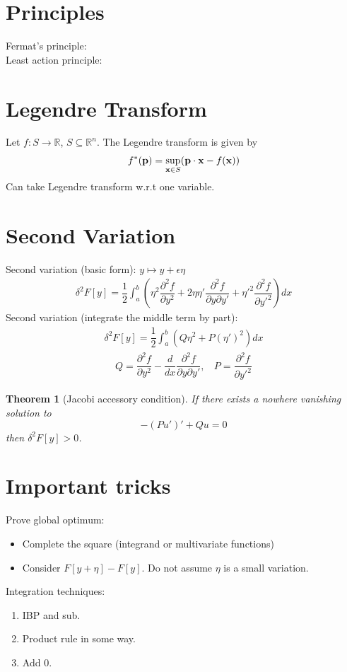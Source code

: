 \documentclass{article}
\theoremstyle{definition}
\theoremstyle{remark}
\theoremstyle{plain}
\newtheorem{thm}[defn]{Theorem}
\newcommand{\RR}{\mathbb{R}}
\begin{document}
\section{Principles}
Fermat's principle:\\
Least action principle:

\section{Legendre Transform}
Let $f:S\to \RR$, $S\subseteq\RR^n$. The Legendre transform is given by
\begin{align*}
    f^\ast({\bf p})=\sup_{{\bf x}\in S}({\bf p}\cdot {\bf x}-f({\bf x}))
\end{align*}
Can take Legendre transform w.r.t one variable.

\section{Second Variation}
Second variation (basic form): $y\mapsto y+\epsilon\eta$
\begin{align*}
    \delta^2F[y]=\dfrac{1}{2}\int_a^b\left(\eta^2\dfrac{\partial^2 f}{\partial y^2}+2\eta\eta'\dfrac{\partial^2 f}{\partial y\partial y'}+\eta'^2\dfrac{\partial^2 f}{\partial y'^2}\right)dx
\end{align*}
Second variation (integrate the middle term by part):
\begin{align*}
    \delta^2F[y]=\dfrac{1}{2}\int_a^b(Q\eta^2+P(\eta')^2)dx
\end{align*}
\begin{align*}
    Q=\dfrac{\partial^2 f}{\partial y^2}-\dfrac{d}{dx}\dfrac{\partial^2 f}{\partial y\partial y'},\ \ \ \ P=\dfrac{\partial^2 f}{\partial y'^2}
\end{align*}
\begin{thm}[Jacobi accessory condition]
    If there exists a nowhere vanishing solution to \[-(Pu')'+Qu=0\]
    then $\delta^2F[y]>0$.
\end{thm}

\section{Important tricks}
Prove global optimum:
\begin{itemize}
    \item Complete the square (integrand or multivariate functions)
    \item Consider $F[y+\eta]-F[y]$. Do not assume $\eta$ is a small variation.
\end{itemize}
Integration techniques:
\begin{enumerate}
    \item IBP and sub.
    \item Product rule in some way.
    \item Add 0.
\end{enumerate}
\end{document}
